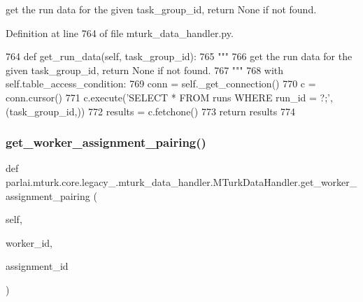 \begin{DoxyVerb}get the run data for the given task_group_id, return None if not found.
\end{DoxyVerb}
 

Definition at line 764 of file mturk\+\_\+data\+\_\+handler.\+py.


\begin{DoxyCode}
764     \textcolor{keyword}{def }get\_run\_data(self, task\_group\_id):
765         \textcolor{stringliteral}{"""}
766 \textcolor{stringliteral}{        get the run data for the given task\_group\_id, return None if not found.}
767 \textcolor{stringliteral}{        """}
768         with self.table\_access\_condition:
769             conn = self.\_get\_connection()
770             c = conn.cursor()
771             c.execute(\textcolor{stringliteral}{'SELECT * FROM runs WHERE run\_id = ?;'}, (task\_group\_id,))
772             results = c.fetchone()
773             \textcolor{keywordflow}{return} results
774 
\end{DoxyCode}
\mbox{\label{classparlai_1_1mturk_1_1core_1_1legacy__2018_1_1mturk__data__handler_1_1MTurkDataHandler_a8478ff4b3117b30f5528ae7bb6533e51}} 
\subsubsection{\texorpdfstring{get\+\_\+worker\+\_\+assignment\+\_\+pairing()}{get\_worker\_assignment\_pairing()}}
{\footnotesize\ttfamily def parlai.\+mturk.\+core.\+legacy\+\_.\+mturk\+\_\+data\+\_\+handler.\+M\+Turk\+Data\+Handler.\+get\+\_\+worker\+\_\+assignment\+\_\+pairing (\begin{DoxyParamCaption}\item[{}]{self,  }\item[{}]{worker\+\_\+id,  }\item[{}]{assignment\+\_\+id }\end{DoxyParamCaption})}

